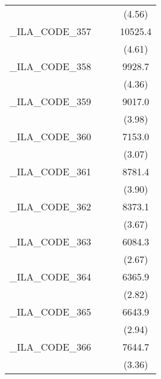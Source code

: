 {\begin{tabular}{l*{3}{c}}
            &                     &                     &      (4.56)         \\
[1em]
\_ILA\_CODE\_357&                     &                     &     10525.4\sym{***}\\
            &                     &                     &      (4.61)         \\
[1em]
\_ILA\_CODE\_358&                     &                     &      9928.7\sym{***}\\
            &                     &                     &      (4.36)         \\
[1em]
\_ILA\_CODE\_359&                     &                     &      9017.0\sym{***}\\
            &                     &                     &      (3.98)         \\
[1em]
\_ILA\_CODE\_360&                     &                     &      7153.0\sym{**} \\
            &                     &                     &      (3.07)         \\
[1em]
\_ILA\_CODE\_361&                     &                     &      8781.4\sym{***}\\
            &                     &                     &      (3.90)         \\
[1em]
\_ILA\_CODE\_362&                     &                     &      8373.1\sym{***}\\
            &                     &                     &      (3.67)         \\
[1em]
\_ILA\_CODE\_363&                     &                     &      6084.3\sym{**} \\
            &                     &                     &      (2.67)         \\
[1em]
\_ILA\_CODE\_364&                     &                     &      6365.9\sym{**} \\
            &                     &                     &      (2.82)         \\
[1em]
\_ILA\_CODE\_365&                     &                     &      6643.9\sym{**} \\
            &                     &                     &      (2.94)         \\
[1em]
\_ILA\_CODE\_366&                     &                     &      7644.7\sym{***}\\
            &                     &                     &      (3.36)         \\

\end{tabular}}
